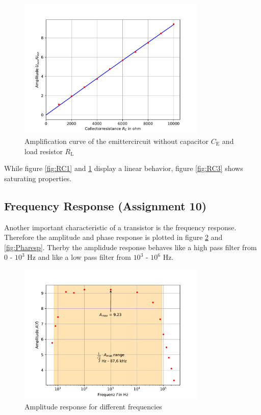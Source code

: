 \documentclass[11pt, a4paper]{article}
\begin{document}
\begin{figure}[h]
    \centering
    \includegraphics[width=0.8\textwidth]{plots/RC2.pdf}
    \caption{Amplification curve of the emittercircuit without capacitor $C_{\text{E}}$ and load resistor $R_{\text{L}}$}
    \label{fig:RC2}
\end{figure}
While figure \ref{fig:RC1} and \ref{fig:RC2} display a linear behavior, figure \ref{fig:RC3} shows saturating properties.

\subsection{Frequency Response (Assignment 10)}
Another important characteristic of a transistor is the frequency response. Therefore the amplitude and phase response is plotted in figure \ref{fig:Ampresp} and \ref{fig:Pharesp}.
Therby the amplidude response behaves like a high pass filter from 0 - $10^3$ \si{\hertz} and like a low pass filter from $10^3$ - $10^6$ \si{\hertz}. 


\begin{figure}[h]
    \centering
    \includegraphics[width=0.8\textwidth]{plots/Amplitudengang.pdf}
    \caption{Amplitude response for different frequencies}
    \label{fig:Ampresp}
\end{figure}
\end{document}
